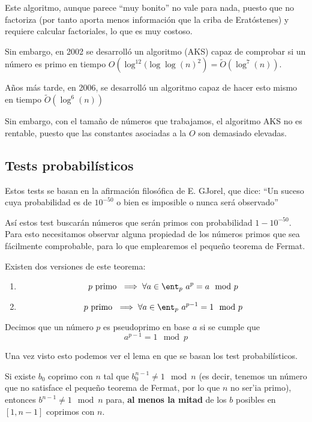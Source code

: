 Este algoritmo, aunque parece ``muy bonito'' no vale para nada, puesto que no factoriza (por tanto aporta menos información que la criba de Eratóstenes) y requiere calcular factoriales, lo que es muy costoso.

Sin embargo, en 2002 se desarrolló un algoritmo (AKS) capaz de comprobar si un número es primo en tiempo $O\left( \log^{12}(\log\log(n)^2\right)= \tilde{O}(\log^7(n))$.

Años más tarde, en 2006, se desarrolló un algoritmo capaz de hacer esto mismo en tiempo $\tilde{O}\left( \log^6(n)\right)$

Sin embargo, con el tamaño de números que trabajamos, el algoritmo AKS no es rentable, puesto que las constantes asociadas a la $O$ son demasiado elevadas.

\subsection{Tests probabilísticos}

Estos tests se basan en la afirmación filosófica de E. GJorel, que dice: ``Un suceso cuya probabilidad es de $10^{-50}$ o bien es imposible o nunca será observado''

Así estos test buscarán números que serán primos con probabilidad $1-10^{-50}$. Para esto necesitamos observar alguna propiedad de los números primos que sea fácilmente comprobable, para lo que emplearemos el pequeño teorema de Fermat.

\begin{theorem}
Existen dos versiones de este teorema:
\begin{enumerate}
\item 
\[p \text{ primo } \implies \forall a \in \ent_p \ a^p=a \mod p\]

\item
\[p \text{ primo } \implies \forall a \in \ent_p \ a^{p-1}=1 \mod p\]
\end{enumerate}
\end{theorem}

\begin{defn}
Decimos que un número $p$ es pseudoprimo en base $a$ si se cumple que
\[a^{p-1}=1 \mod p \]
\end{defn}

Una vez visto esto podemos ver el lema en que se basan los test probabilísticos.
\begin{lemma}
Si existe $b_0$ coprimo con $n$ tal que $b_0^{n-1}\neq 1 \mod n$ (es decir, tenemos un número que no satisface el pequeño teorema de Fermat, por lo que $n$ no ser'ia primo), entonces $b^{n-1} \neq 1 \mod n$ para, \textbf{al menos la mitad} de los $b$ posibles en $[1,n-1]$ coprimos con $n$.
\end{lemma}

